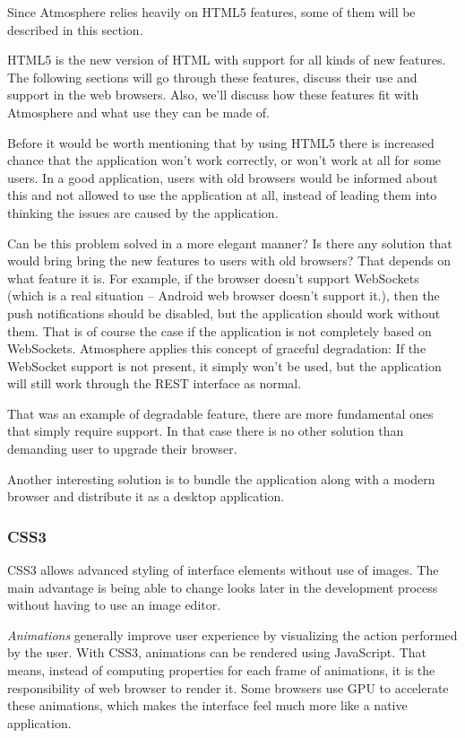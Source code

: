 Since Atmosphere relies heavily on HTML5 features, some of them will be described in this section. \citep{maccaw_js} \citep{html5_book} \citep{css3_book}

HTML5 is the new version of HTML with support for all kinds of new features. The following sections will go through these features, discuss their use and support in the web browsers. Also, we’ll discuss how these features fit with Atmosphere and what use they can be made of.

Before it would be worth mentioning that by using HTML5 there is increased chance that the application won’t work correctly, or won’t work at all for some users. In a good application, users with old browsers would be informed about this and not allowed to use the application at all, instead of leading them into thinking the issues are caused by the application. 

Can be this problem solved in a more elegant manner? Is there any solution that would bring bring the new features to users with old browsers? That depends on what feature it is. For example, if the browser doesn’t support WebSockets (which is a real situation – Android web browser doesn’t support it.), then the push notifications should be disabled, but the application should work without them. That is of course the case if the application is not completely based on WebSockets. Atmosphere applies this concept of graceful degradation: If the WebSocket support is not present, it simply won’t be used, but the application will still work through the REST interface as normal.

That was an example of degradable feature, there are more fundamental ones that simply require support. In that case there is no other solution than demanding user to upgrade their browser.

Another interesting solution is to bundle the application along with a modern browser and distribute it as a desktop application.

\subsubsection{CSS3}

CSS3 allows advanced styling of interface elements without use of images. The main advantage is being able to change looks later in the development process without having to use an image editor. \citep{css3_book}

\emph{Animations} generally improve user experience by visualizing the action performed by the user. With CSS3, animations can be rendered using JavaScript. That means, instead of computing properties for each frame of animations, it is the responsibility of web browser to render it. Some browsers use GPU to accelerate these animations, which makes the interface feel much more like a native application.

